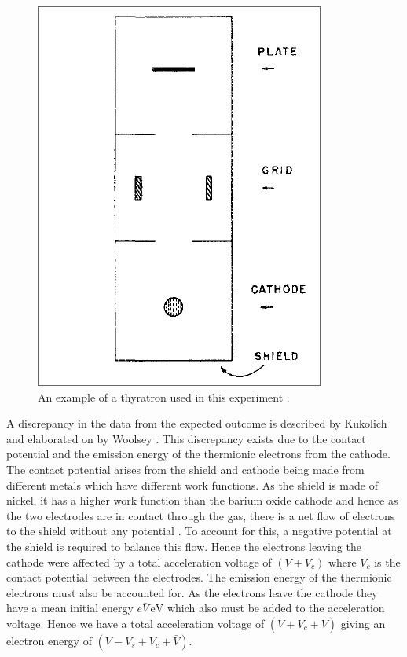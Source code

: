 \documentclass[%
reprint,
amsmath,amssymb,
aps,
floatfix
]{revtex4-2}
\begin{document}
	\begin{figure}
		\includegraphics[width=0.65\columnwidth]{thyratron.png}
		\caption{\label{fig:thyratron}An example of a thyratron used in this experiment \cite{kukolich}.}
	\end{figure}
	
	A discrepancy in the data from the expected outcome is described by Kukolich and elaborated on by Woolsey \cite{kukolich} \cite{woolsey}. This discrepancy exists due to the contact potential and the emission energy of the thermionic electrons from the cathode. The contact potential arises from the shield and cathode being made from different metals which have different work functions. As the shield is made of nickel, it has a higher work function than the barium oxide cathode and hence as the two electrodes are in contact through the gas, there is a net flow of electrons to the shield without any potential \cite{woolsey}. To account for this, a negative potential at the shield is required to balance this flow. Hence the electrons leaving the cathode were affected by a total acceleration voltage of $(V + V_c)$ where $V_c$ is the contact potential between the electrodes. The emission energy of the thermionic electrons must also be accounted for. As the electrons leave the cathode they have a mean initial energy $e\bar{V} \,\text{eV}$ which also must be added to the acceleration voltage. Hence we have a total acceleration voltage of $(V + V_c + \bar{V})$ giving an electron energy of $(V - V_s + V_c + \bar{V})$.
	
\end{document}
